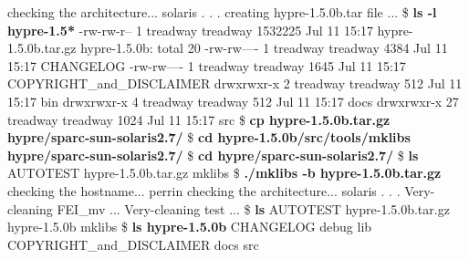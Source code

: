 \begin{ttfamily}
\begin{mdseries}
checking the architecture... solaris\linebreak
 . . .\linebreak
creating hypre-1.5.0b.tar file ...\linebreak
\$ \textbf{ls -l hypre-1.5*}\linebreak
-rw-rw-r--   1 treadway treadway 1532225 Jul 11 15:17 hypre-1.5.0b.tar.gz\linebreak
\linebreak
hypre-1.5.0b:\linebreak
total 20\linebreak
-rw-rw----   1 treadway treadway    4384 Jul 11 15:17 CHANGELOG\linebreak
-rw-rw----   1 treadway treadway    1645 Jul 11 15:17 COPYRIGHT\_and\_DISCLAIMER\linebreak
drwxrwxr-x   2 treadway treadway     512 Jul 11 15:17 bin\linebreak
drwxrwxr-x   4 treadway treadway     512 Jul 11 15:17 docs\linebreak
drwxrwxr-x  27 treadway treadway    1024 Jul 11 15:17 src\linebreak
\$ \textbf{cp hypre-1.5.0b.tar.gz hypre/sparc-sun-solaris2.7/}\linebreak
\$ \textbf{cd hypre-1.5.0b/src/tools/mklibs hypre/sparc-sun-solaris2.7/}\linebreak
\$ \textbf{cd hypre/sparc-sun-solaris2.7/}\linebreak
\$ \textbf{ls}\linebreak
AUTOTEST             hypre-1.5.0b.tar.gz  mklibs\linebreak
\$ \textbf{./mklibs -b hypre-1.5.0b.tar.gz}\linebreak
checking the hostname... perrin\linebreak
checking the architecture... solaris\linebreak
 . . .\linebreak
Very-cleaning FEI\_mv ...\linebreak
Very-cleaning test ...\linebreak
\$ \textbf{ls}\linebreak
AUTOTEST             hypre-1.5.0b.tar.gz\linebreak
hypre-1.5.0b         mklibs\linebreak
\$ \textbf{ls hypre-1.5.0b}\linebreak
CHANGELOG                 debug                     lib\linebreak
COPYRIGHT\_and\_DISCLAIMER  docs                      src\linebreak

\end{mdseries}
\end{ttfamily}
